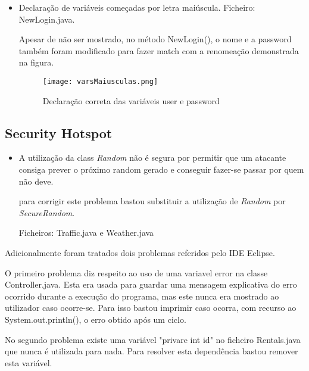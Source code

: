\begin{itemize}
\item Declaração de variáveis começadas por letra maiúscula. \newline
 Ficheiro: NewLogin.java.\newline

\par Apesar de não ser mostrado, no método NewLogin(), o nome e a password também foram modificado para fazer match com a renomeação demonstrada na figura.

\begin{figure}[H]

  \centering

  \texttt{[image: varsMaiusculas.png]}

  \caption {Declaração correta das variáveis user e password}

  \label {fig26}

\end{figure}

\end{itemize}

\subsection{Security Hotspot}

\begin{itemize}

\item A utilização da class \textit{Random} não é segura por permitir que um atacante consiga prever o próximo random gerado e conseguir fazer-se passar por quem não deve.\newline

\par para corrigir este problema bastou substituir a utilização de \textit{Random} por \textit{SecureRandom}.

Ficheiros: Traffic.java e Weather.java

\end{itemize}

\par Adicionalmente foram tratados dois problemas referidos pelo IDE Eclipse.

\par O primeiro problema diz respeito ao uso de uma variavel error na classe Controller.java. Esta era usada para guardar uma mensagem explicativa do erro ocorrido durante a execução do programa, mas este nunca era mostrado ao utilizador caso ocorre-se. Para isso bastou imprimir caso ocorra, com recurso ao System.out.println(), o erro obtido após um ciclo.\newline

\par No segundo problema existe uma variável "privare int id" no ficheiro Rentals.java que nunca é utilizada para nada. Para resolver esta dependência bastou remover esta variável.\newline 










